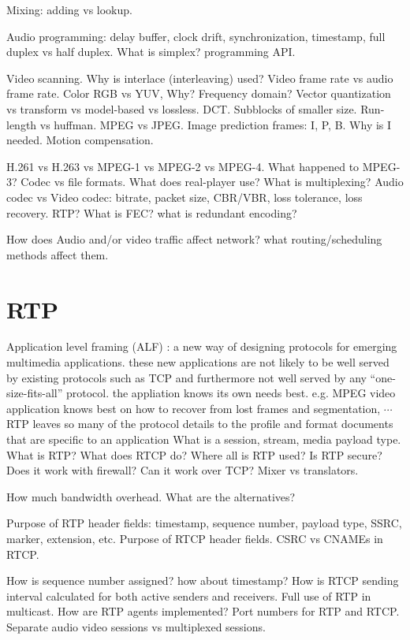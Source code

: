 \documentclass{myart}
\begin{document}
\w Mixing: adding vs lookup.

\w Audio programming: delay buffer, clock drift, synchronization, 
timestamp, full duplex vs half duplex. What is simplex? programming API.

\w Video scanning. Why is interlace (interleaving) used?
Video frame rate vs audio frame rate. Color RGB vs YUV, Why?
Frequency domain? Vector quantization vs transform vs model-based vs lossless.
DCT. Subblocks of smaller size. Run-length vs huffman. MPEG vs JPEG. Image prediction frames: I, P, B. Why is I needed. Motion compensation.

\w H.261 vs H.263 vs MPEG-1 vs MPEG-2 vs MPEG-4. What happened to
MPEG-3?  Codec vs file formats. What does real-player use? What is
multiplexing? Audio codec vs Video codec: bitrate, packet size,
CBR/VBR, loss tolerance, loss recovery. RTP? What is FEC? what is
redundant encoding?

\w How does Audio and/or video traffic affect network? what
routing/scheduling methods affect them.
\een

\section*{RTP}
\ben
\w Application level framing (ALF)
	\bit
	\w {}: a new way of designing protocols for emerging multimedia
applications. these new applications are not likely to be well served by
existing protocols such as TCP and furthermore not well served by any
``one-size-fits-all'' protocol. the appliation knows its own needs
best. e.g. MPEG video application knows best on how to recover from lost
frames and segmentation, $\cdots$ RTP leaves so many of the protocol details
to the profile and format documents that are specific to an application
	\eit
\w What is a session, stream, media payload type. What is RTP? What
does RTCP do? Where all is RTP used? Is RTP secure? Does it work with
firewall? Can it work over TCP? Mixer vs translators.

\w How much bandwidth overhead. What are the alternatives?

\w Purpose of RTP header fields: timestamp, sequence number, payload
type, SSRC, marker, extension, etc. Purpose of RTCP header
fields. CSRC vs CNAMEs in RTCP.

\w How is sequence number assigned? how about timestamp? How is RTCP
sending interval calculated for both active senders and
receivers. Full use of RTP in multicast. How are RTP agents
implemented? Port numbers for RTP and RTCP. Separate audio video
sessions vs multiplexed sessions.
\end{document}
